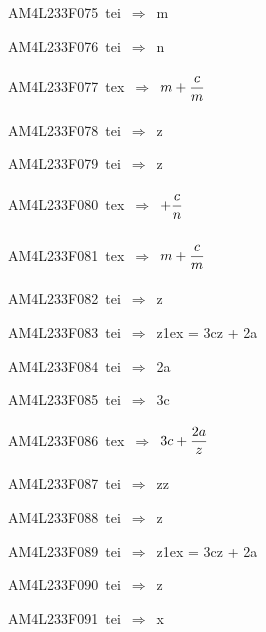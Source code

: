 {\sixrm AM4L233F075\ {\sixit tei}\ }$\Rightarrow$\ {\tenit m}\par\smallskip
{\sixrm AM4L233F076\ {\sixit tei}\ }$\Rightarrow$\ {\tenit n}\par\smallskip
{\sixrm AM4L233F077\ {\sixit tex}\ }$\Rightarrow$\ $m + {\displaystyle\strut c\over \displaystyle\strut m}$\par\smallskip
{\sixrm AM4L233F078\ {\sixit tei}\ }$\Rightarrow$\ {\tenit z}\par\smallskip
{\sixrm AM4L233F079\ {\sixit tei}\ }$\Rightarrow$\ {\tenit z}\par\smallskip
{\sixrm AM4L233F080\ {\sixit tex}\ }$\Rightarrow$\ $+ {\displaystyle\strut c\over \displaystyle\strut n}$\par\smallskip
{\sixrm AM4L233F081\ {\sixit tex}\ }$\Rightarrow$\ $m + {\displaystyle\strut c\over \displaystyle\strut m}$\par\smallskip
{\sixrm AM4L233F082\ {\sixit tei}\ }$\Rightarrow$\ {\tenit z}\par\smallskip
{\sixrm AM4L233F083\ {\sixit tei}\ }$\Rightarrow$\ {\tenit z}\raise1ex\hbox{} = 3{\tenit cz} + 2{\tenit a}\par\smallskip
{\sixrm AM4L233F084\ {\sixit tei}\ }$\Rightarrow$\ 2{\tenit a}\par\smallskip
{\sixrm AM4L233F085\ {\sixit tei}\ }$\Rightarrow$\ 3{\tenit c}\par\smallskip
{\sixrm AM4L233F086\ {\sixit tex}\ }$\Rightarrow$\ $3c + {\displaystyle\strut 2a\over \displaystyle\strut z}$\par\smallskip
{\sixrm AM4L233F087\ {\sixit tei}\ }$\Rightarrow$\ {\tenit zz}\par\smallskip
{\sixrm AM4L233F088\ {\sixit tei}\ }$\Rightarrow$\ {\tenit z}\par\smallskip
{\sixrm AM4L233F089\ {\sixit tei}\ }$\Rightarrow$\ {\tenit z}\raise1ex\hbox{} = 3{\tenit cz} + 2{\tenit a}\par\smallskip
{\sixrm AM4L233F090\ {\sixit tei}\ }$\Rightarrow$\ {\tenit z}\par\smallskip
{\sixrm AM4L233F091\ {\sixit tei}\ }$\Rightarrow$\ {\tenit x}\par\smallskip


